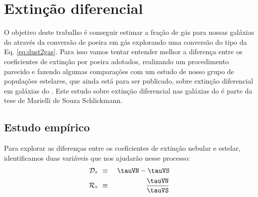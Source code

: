 



\chapter{Extinção diferencial}
\label{sec:difextin}

O objetivo deste trabalho é conseguir estimar a fração de gás para nossas galáxias do \CAL através
da conversão de poeira em gás explorando uma conversão do tipo da Eq. \ref{eq:dust2gas}. Para isso
vamos tentar entender melhor a diferença entre os coeficientes de extinção por poeira adotados,
realizando um procedimento parecido e fazendo algumas comparações com um estudo de nosso grupo de
populações estelares, que ainda está para ser publicado, sobre extinção diferencial em galáxias do
\SDSS. Este estudo sobre extinção diferencial nas galáxias do \SDSS é parte da tese de Marielli de
Souza Schlickmann.

\section{Estudo empírico}
\label{sec:difextin:emp}

Para explorar as diferenças entre os coeficientes de extinção nebular e estelar, identificamos duas
variáveis que nos ajudarão nesse processo:
\begin{eqnarray}
	\mathcal{D}_\tau\ &\equiv&\ \tauVN - \tauVS \\
	\label{eq:difftau}
	\mathcal{R}_\tau\ &\equiv&\ \frac{\tauVN}{\tauVS} 
	\label{eq:ratiotau}
\end{eqnarray}

